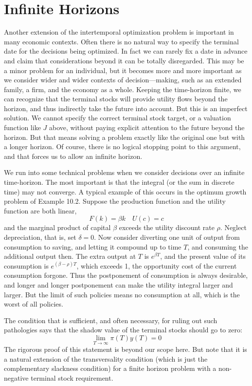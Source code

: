 \section*{Infinite Horizons}

Another extension of the intertemporal optimization problem is important in many economic contexts. Often there is no natural way to specify the terminal date for the decisions being optimized. In fact we can rarely fix a date in advance and claim that considerations beyond it can be totally disregarded. This may be a minor problem for an individual, but it becomes more and more important as we consider wider and wider contexts of decision—making, such as an extended family, a firm, and the economy as a whole. Keeping the time-horizon finite, we can recognize that the terminal stocks will provide utility flows beyond the horizon, and thus indirectly take the future into account. But this is an imperfect solution. We cannot specify the correct terminal stock target, or a valuation function like $J$ above, without paying explicit attention to the future beyond the horizon. But that means solving a problem exactly like the original one but with a longer horizon. Of course, there is no logical stopping point to this argument, and that forces us to allow an infinite horizon.

We run into some technical problems when we consider decisions over an infinite time-horizon. The most important is that the integral (or the sum in discrete time) may not converge. A typical example of this occurs in the optimum growth problem of Example 10.2. Suppose the production function and the utility function are both linear,
\begin{equation*}
 F(k ) = \beta k  \quad U(c) =c
\end{equation*}
and the marginal product of capital $\beta$ exceeds the utility discount rate $\rho$. Neglect depreciation, that is, set $\delta = 0$. Now consider diverting one unit of output from consumption to saving, and letting it compound up to time $T$, and consuming the additional output then. The extra output at $T$ is $e^{\beta T}$, and the present value of its consumption is $e^{(\beta - \rho)T}$, which exceeds 1, the opportunity cost of the current consumption forgone. Thus the postponement of consumption is always desirable, and longer and longer postponement can make the utility integral larger and larger. But the limit of such policies means no consumption at all, which is the worst of all policies.

The condition that is sufficient, and often necessary, for ruling out such pathologies says that the shadow value of the terminal stocks should go to zero:
\begin{equation} \label{equa11.10}
\lim\limits_{T \rightarrow \infty} \pi(T) y(T) =0
\end{equation}
The rigorous proof of this statement is beyond our scope here. But note that it is a natural extension of the transversality condition (which is just the complementary slackness condition) for a finite horizon problem with a non-negative terminal stock requirement.


